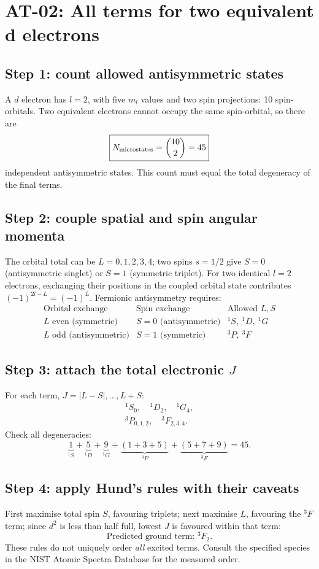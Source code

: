 
\section{AT-02: All terms for two equivalent d electrons}
\subsection*{Step 1: count allowed antisymmetric states}
A \(d\) electron has \(l=2\), with five \(m_l\) values
and two spin projections: 10 spin-orbitals. Two equivalent
electrons cannot occupy the same spin-orbital,
so there are
\[
\boxed{N_{\rm microstates}=\binom{10}{2}=45}
\]
independent antisymmetric states. This count must equal
the total degeneracy of the final terms.

\subsection*{Step 2: couple spatial and spin angular momenta}
The orbital total can be
\(L=0,1,2,3,4\); two spins \(s=1/2\) give
\(S=0\) (antisymmetric singlet) or \(S=1\)
(symmetric triplet). For two identical \(l=2\)
electrons, exchanging their positions in the
coupled orbital state contributes \((-1)^{2l-L}=(-1)^L\).
Fermionic antisymmetry requires:
\[
\begin{array}{c|c|l}
\text{Orbital exchange}&\text{Spin exchange}&\text{Allowed }L,S\\\hline
L\text{ even (symmetric)}&S=0\text{ (antisymmetric)}&
{}^1S,\ {}^1D,\ {}^1G\\
L\text{ odd (antisymmetric)}&S=1\text{ (symmetric)}&
{}^3P,\ {}^3F
\end{array}
\]

\subsection*{Step 3: attach the total electronic \(J\)}
For each term, \(J=|L-S|,\ldots,L+S\):
\[
\boxed{\begin{gathered}
{}^1S_0,\quad {}^1D_2,\quad{}^1G_4,\\
{}^3P_{0,1,2},\quad{}^3F_{2,3,4}.
\end{gathered}}
\]
Check all degeneracies:
\[
\underbrace{1}_{^1S}+\underbrace5_{^1D}
+\underbrace9_{^1G}+\underbrace{(1+3+5)}_{^3P}
+\underbrace{(5+7+9)}_{^3F}
=\boxed{45}.
\]

\subsection*{Step 4: apply Hund's rules with their caveats}
First maximise total spin \(S\), favouring triplets;
next maximise \(L\), favouring the \({}^3F\) term;
since \(d^2\) is less than half full, lowest \(J\)
is favoured within that term:
\[
\boxed{\text{Predicted ground term: }{}^3F_2}.
\]
These rules do not uniquely order \emph{all}
excited terms. Consult the specified species in
the NIST Atomic Spectra Database for the measured order.
